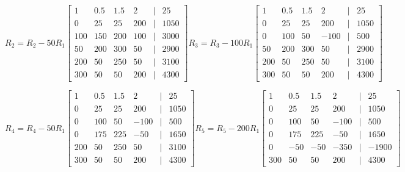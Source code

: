 \documentclass[11pt]{article}
\begin{document}
\begin{enumerate}
\begin{enumerate}
\[
    R_2 = R_2 - 50R_1
    \begin{bmatrix}
        1 & 0.5 & 1.5 & 2 &|& 25 \\
        0 & 25 & 25 & 200 &|& 1050 \\
        100 & 150 & 200 & 100 &|& 3000 \\
        50 & 200 & 300 & 50 &|& 2900 \\
        200 & 50 & 250 & 50 &|& 3100 \\
        300 & 50 & 50 & 200 &|& 4300
    \end{bmatrix}
    R_3 = R_3 - 100R_1
    \begin{bmatrix}
        1 & 0.5 & 1.5 & 2 &|& 25 \\
        0 & 25 & 25 & 200 &|& 1050 \\
        0 & 100 & 50 & -100 &|& 500 \\
        50 & 200 & 300 & 50 &|& 2900 \\
        200 & 50 & 250 & 50 &|& 3100 \\
        300 & 50 & 50 & 200 &|& 4300
    \end{bmatrix}
\]

\[
    R_4 = R_4 - 50R_1
    \begin{bmatrix}
        1 & 0.5 & 1.5 & 2 &|& 25 \\
        0 & 25 & 25 & 200 &|& 1050 \\
        0 & 100 & 50 & -100 &|& 500 \\
        0 & 175 & 225 & -50 &|& 1650 \\
        200 & 50 & 250 & 50 &|& 3100 \\
        300 & 50 & 50 & 200 &|& 4300
    \end{bmatrix}
    R_5 = R_5 - 200R_1
    \begin{bmatrix}
        1 & 0.5 & 1.5 & 2 &|& 25 \\
        0 & 25 & 25 & 200 &|& 1050 \\
        0 & 100 & 50 & -100 &|& 500 \\
        0 & 175 & 225 & -50 &|& 1650 \\
        0 & -50 & -50 & -350 &|& -1900 \\
        300 & 50 & 50 & 200 &|& 4300
    \end{bmatrix}
\]


\end{enumerate}
\end{enumerate}
\end{document}

